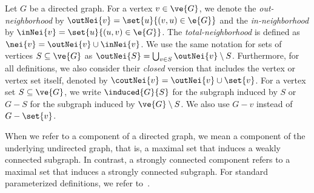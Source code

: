 Let $G$ be a directed graph. For a vertex $v \in \ve{G}$, we denote the \emph{out-neighborhood} by $\outNei{v} = \set{u}{(v,u) \in \e{G}}$ and the \emph{in-neighborhood} by $\inNei{v} = \set{u}{(u,v) \in \e{G}}$.
The \emph{total-neighborhood} is defined as $\nei{v} = \outNei{v} \cup \inNei{v}$.
We use the same notation for sets of vertices $S \subseteq \ve{G}$ as $\outNei{S} = \bigcup_{v \in S} \outNei{v} \setminus S$. 
Furthermore, for all definitions, we also consider their \emph{closed} version that includes the vertex or vertex set itself, denoted by $\coutNei{v} = \outNei{v} \cup \set{v}$.
For a vertex set $S \subseteq \ve{G}$, we write $\induced{G}{S}$ for the subgraph induced by $S$ or $G - S$ for the subgraph induced by $\ve{G} \setminus S$. We also use $G - v$ instead of $G - \set{v}$.

When we refer to a component of a directed graph, we mean a component of the underlying undirected graph, that is, a maximal set that induces a weakly connected subgraph. In contrast, a strongly connected component refers to a maximal set that induces a strongly connected subgraph.
For standard parameterized definitions, we refer to~\cite{cygan2015parameterized}.

